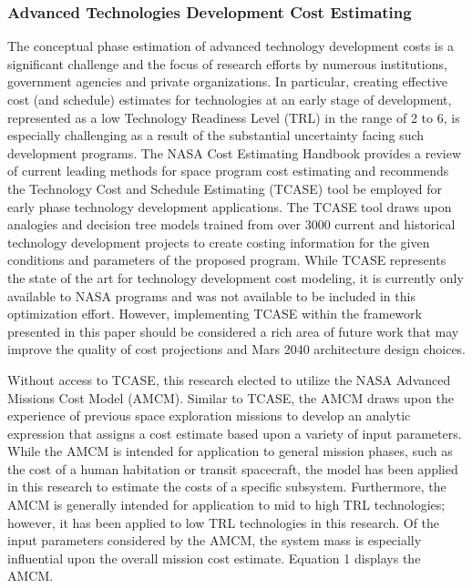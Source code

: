 \documentclass[]{aiaa-pretty}
\begin{document}
\subsubsection{Advanced Technologies Development Cost Estimating}
The conceptual phase estimation of advanced technology development costs is a significant challenge and the focus of research efforts by numerous institutions, government agencies and private organizations. In particular, creating effective cost (and schedule) estimates for technologies at an early stage of development, represented as a low Technology Readiness Level (TRL) in the range of 2 to 6, is especially challenging as a result of the substantial uncertainty facing such development programs. \cite{cole2013technology} The NASA Cost Estimating Handbook provides a review of current leading methods for space program cost estimating and recommends the Technology Cost and Schedule Estimating (TCASE) tool be employed for early phase technology development applications. \cite{nasa2015handbook} The TCASE tool draws upon analogies and decision tree models trained from over 3000 current and historical technology development projects to create costing information for the given conditions and parameters of the proposed program. While TCASE represents the state of the art for technology development cost modeling, it is currently only available to NASA programs and was not available to be included in this optimization effort. However, implementing TCASE within the framework presented in this paper should be considered a rich area of future work that may improve the quality of cost projections and Mars 2040 architecture design choices. 

Without access to TCASE, this research elected to utilize the NASA Advanced Missions Cost Model (AMCM). Similar to TCASE, the AMCM draws upon the experience of previous space exploration missions to develop an analytic expression that assigns a cost estimate based upon a variety of input parameters. While the AMCM is intended for application to general mission phases, such as the cost of a human habitation or transit spacecraft, the model has been applied in this research to estimate the costs of a specific subsystem. Furthermore, the AMCM is generally intended for application to mid to high TRL technologies; however, it has been applied to low TRL technologies in this research. \cite{jones2015estimating} Of the input parameters considered by the AMCM, the system mass is especially influential upon the overall mission cost estimate. Equation 1 displays the AMCM. \cite{larson1999human}
\end{document}

